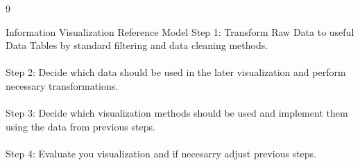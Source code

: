 \documentclass{article}
\begin{document}
    \begin{ukon-infie}[17.01.18]{9}

        \begin{exercise}[p=4]{Information Visualization Reference Model}  
       	Step 1: Transform Raw Data to useful Data Tables by standard filtering and data cleaning methods.\\\\
       	Step 2: Decide which data should be used in the later visualization and perform necessary transformations.\\\\
       	Step 3: Decide which visualization methods should be used and implement them using the data from previous steps.\\\\
       	Step 4: Evaluate you visualization and if necesarry adjust previous steps.
    	

		\end{exercise}
		

\end{ukon-infie}
\end{document}
